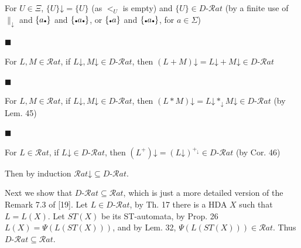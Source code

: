 For $U\in\Xi$, ${\{U\}}\mathord{\downarrow}={\{U\}}$ (as $<_{U}$ is empty) and ${\{U\}}\in D\text{-}\mathcal{R}at$ (by a finite use of $\parallel_{\mathord{\downarrow}}$ and ${\{a\vbox{\hbox{\tiny$\bullet$}}\}}$ and ${\{\vbox{\hbox{\tiny$\bullet$}}a\vbox{\hbox{\tiny$\bullet$}}\}}$, or ${\{\vbox{\hbox{\tiny$\bullet$}}a\}}$ and ${\{\vbox{\hbox{\tiny$\bullet$}}a\vbox{\hbox{\tiny$\bullet$}}\}}$, for $a\in\Sigma$)\par
 
 
 
\par\noindent  $\blacksquare$ 
 
For $L,M\in\mathcal{R}at$, if $L\mathord{\downarrow},M\mathord{\downarrow}\in D\text{-}\mathcal{R}at$, then $(L+M)\mathord{\downarrow}=L\mathord{\downarrow}+M\mathord{\downarrow}\in D\text{-}\mathcal{R}at$\par
 
 
 
\par\noindent  $\blacksquare$ 
 
For $L,M\in\mathcal{R}at$, if $L\mathord{\downarrow},M\mathord{\downarrow}\in D\text{-}\mathcal{R}at$, then $(L*M)\mathord{\downarrow}=L\mathord{\downarrow}*_{\mathord{\downarrow}}M\mathord{\downarrow}\in D\text{-}\mathcal{R}at$ (by Lem. 45)\par
 
 
 
\par\noindent  $\blacksquare$ 
 
For $L\in\mathcal{R}at$, if $L\mathord{\downarrow}\in D\text{-}\mathcal{R}at$, then $(L^{+})\mathord{\downarrow}=(L\mathord{\downarrow})^{+_{\mathord{\downarrow}}}\in D\text{-}\mathcal{R}at$ (by Cor. 46)\par
 
 
  
Then by induction $\mathcal{R}at\mathord{\downarrow}\subseteq D\text{-}\mathcal{R}at$.\par
 
 
 
Next we show that $D\text{-}\mathcal{R}at\subseteq\mathcal{R}at$, which is just a more detailed version of the Remark 7.3 of [19]. Let $L\in D\text{-}\mathcal{R}at$, by Th. 17 there is a HDA $X$ such that $L=L(X)$. Let $ST(X)$ be its ST-automata, by Prop. 26 $L(X)=\Psi(L(ST(X)))$, and by Lem. 32, $\Psi(L(ST(X)))\in\mathcal{R}at$. Thus $D\text{-}\mathcal{R}at\subseteq\mathcal{R}at$.\par
 
